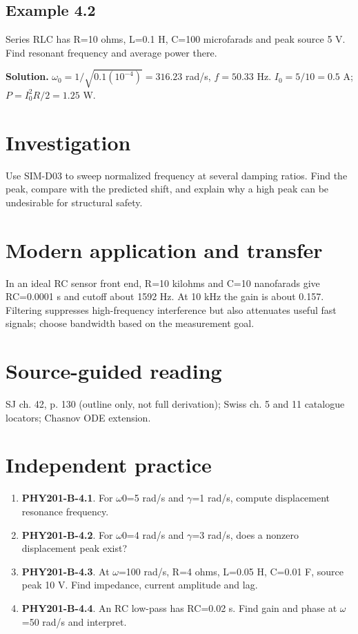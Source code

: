 \documentclass[11pt,a4paper,openany]{book}
\begin{document}
\subsection*{Example 4.2}
Series RLC has R=10 ohms, L=0.1 H, C=100 microfarads and peak source 5 V. Find resonant frequency and average power there.

\textbf{Solution.} $\omega_0=1/\sqrt{0.1(10^{-4})}=316.23$ rad/s, $f=50.33$ Hz. $I_0=5/10=0.5$ A; $P=I_0^2R/2=1.25$ W.
\section{Investigation}
Use SIM-D03 to sweep normalized frequency at several damping ratios. Find the peak, compare with the predicted shift, and explain why a high peak can be undesirable for structural safety.
\section{Modern application and transfer}
In an ideal RC sensor front end, R=10 kilohms and C=10 nanofarads give RC=0.0001 s and cutoff about 1592 Hz. At 10 kHz the gain is about 0.157. Filtering suppresses high-frequency interference but also attenuates useful fast signals; choose bandwidth based on the measurement goal.
\section{Source-guided reading}
SJ ch. 42, p. 130 (outline only, not full derivation); Swiss ch. 5 and 11 catalogue locators; Chasnov ODE extension.
\section{Independent practice}
\begin{enumerate}
\item \textbf{PHY201-B-4.1}. For \ensuremath{\omega}0=5 rad/s and \ensuremath{\gamma}=1 rad/s, compute displacement resonance frequency.
\item \textbf{PHY201-B-4.2}. For \ensuremath{\omega}0=4 rad/s and \ensuremath{\gamma}=3 rad/s, does a nonzero displacement peak exist?
\item \textbf{PHY201-B-4.3}. At \ensuremath{\omega}=100 rad/s, R=4 ohms, L=0.05 H, C=0.01 F, source peak 10 V. Find impedance, current amplitude and lag.
\item \textbf{PHY201-B-4.4}. An RC low-pass has RC=0.02 s. Find gain and phase at \ensuremath{\omega}=50 rad/s and interpret.
\end{enumerate}
\end{document}
